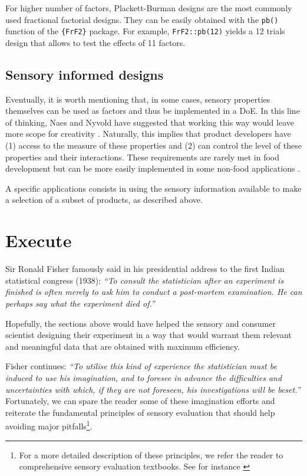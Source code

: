 \documentclass[
]{krantz}
\begin{document}
For higher number of factors, Plackett-Burman designs are the most commonly used fractional factorial designs. They can be easily obtained with the \texttt{pb()} function of the \texttt{\{FrF2\}} package. For example, \texttt{FrF2::pb(12)} yields a 12 trials design that allows to test the effects of 11 factors.

\hypertarget{sensory-informed-designs}{%
\subsection{Sensory informed designs}\label{sensory-informed-designs}}

Eventually, it is worth mentioning that, in some cases, sensory properties themselves can be used as factors and thus be implemented in a DoE. In this line of thinking, Naes and Nyvold have suggested that working this way would leave more scope for creativity \citep{Naes2004}. Naturally, this implies that product developers have (1) access to the measure of these properties and (2) can control the level of these properties and their interactions. These requirements are rarely met in food development but can be more easily implemented in some non-food applications \citep[see for example][]{Petiot2022}.

A specific applications consists in using the sensory information available to make a selection of a subset of products, as described above.

\hypertarget{execute-1}{%
\section{Execute}\label{execute-1}}

Sir Ronald Fisher famously said in his presidential address to the first Indian statistical congress (1938): \emph{``To consult the statistician after an experiment is finished is often merely to ask him to conduct a post-mortem examination. He can perhaps say what the experiment died of.''}

Hopefully, the sections above would have helped the sensory and consumer scientist designing their experiment in a way that would warrant them relevant and meaningful data that are obtained with maximum efficiency.

Fisher continues: \emph{``To utilise this kind of experience the statistician must be induced to use his imagination, and to foresee in advance the difficulties and uncertainties with which, if they are not foreseen, his investigations will be beset.''}
Fortunately, we can spare the reader some of these imagination efforts and reiterate the fundamental principles of sensory evaluation that should help avoiding major pitfalls\footnote{For a more detailed description of these principles, we refer the reader to comprehensive sensory evaluation textbooks. See for instance \citep{LawlessHeym2010, civille2015, stone2020}}.
\end{document}
